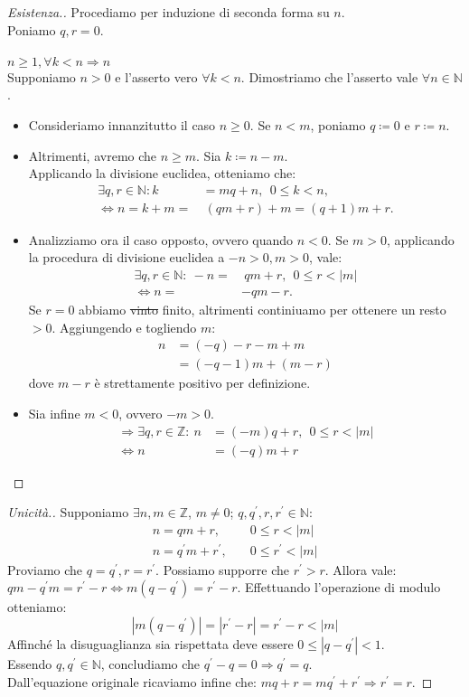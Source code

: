 \documentclass[12pt,twoscolu]{article}
\newcommand{\N}{\mathbb{N}}
\newcommand{\Z}{\mathbb{Z}}
\newcommand{\sesolose}{\Leftrightarrow}
\newcommand{\implica}{\Longrightarrow}
\newcommand{\nin}{\forall n\in\N}
\newcommand{\pr}{\prime}
\renewcommand\qedsymbol{$\blacksquare$}
\newcommand{\baseinduz}[1]{\newline\newline {\boldmath$n = #1$}}
\newcommand{\induzdue}[1]{\\\\{\boldmath$n \ge #1, \forall k < n \implica n$}}
\begin{document}
\renewcommand\qedsymbol{$\square$}
\begin{proof}[Esistenza.]
Procediamo per induzione di seconda forma su $n$.
\baseinduz{0}
\\Poniamo $q, r = 0$.
\induzdue{1}
\\Supponiamo $n > 0$ e l'asserto vero $\forall k < n$. Dimostriamo che l'asserto vale $\nin$.
\begin{itemize}
\item Consideriamo innanzitutto il caso $n \ge 0$. Se $n < m$, poniamo $q \coloneqq 0$ e $ r \coloneqq n$.
\item Altrimenti, avremo che $n \ge m$. Sia $k \coloneqq n - m$.\\Applicando la divisione euclidea, otteniamo che:
\begin{align*}
\exists q, r \in \N : k &= mq + n, \ \ 0 \le k <n, \\
\sesolose n = k + m =&\ (qm + r) + m = (q+1) m + r.
\end{align*}
\item Analizziamo ora il caso opposto, ovvero quando $n < 0$. Se $m > 0$, applicando la procedura di divisione euclidea a $-n > 0, m >0$, vale:
\begin{align*}
\exists q, r \in \N:\ -n =&  \ qm + r, \ \ 0 \le r < |m| \\
\sesolose n =& - qm - r.
\end{align*}
Se $ r = 0$ abbiamo \sout{vinto} finito, altrimenti continiuamo per ottenere un resto $> 0$. Aggiungendo e togliendo $m$:
\begin{align*}
n &= (-q)-r-m+m \\
&= (-q-1)m+(m-r)
\end{align*}
dove $m-r$ è strettamente positivo per definizione.
\item Sia infine $m < 0$, ovvero $-m > 0$.
\begin{align*}
\implica \exists q, r \in \Z:\ n &= (-m)q + r, \ \ 0 \le r < |m| \\
 \sesolose n &= (-q)m + r 
\end{align*}
\end{itemize}
\end{proof}
\renewcommand\qedsymbol{$\blacksquare$}
\begin{proof}[Unicità.]
Supponiamo $\exists n, m \in \Z$, $m \ne 0$; $q, q^{\pr}, r, r^{\pr} \in \N$:
\begin{align*}
n = qm + r,& \quad 0 \le r < |m| \\
n = q^{\pr}m + r^{\pr},& \quad 0 \le r^{\pr} < |m|
\end{align*}
Proviamo che $ q = q^{\pr}, r = r^{\pr}$. Possiamo supporre che $r^{\pr} > r$. Allora vale:
\\$ qm - q^{\pr}m = r^{\pr} - r \sesolose m(q-q^{\pr}) = r^{\pr}-r$. Effettuando l'operazione di modulo otteniamo:
$$ |m(q-q^{\pr})| = |r^{\pr} - r| = r^{\pr} - r < |m|$$
Affinché la disuguaglianza sia rispettata deve essere $ 0 \le |q-q^{\pr}| < 1 $.
\\ Essendo $q, q^{\pr} \in \N$, concludiamo che $q^{\pr} - q = 0 \implica q^{\pr} = q$.
\\ Dall'equazione originale ricaviamo infine che: $mq + r = mq^{\pr} + r^{\pr} \implica r^{\pr} = r$.
\end{proof}
\end{document}

